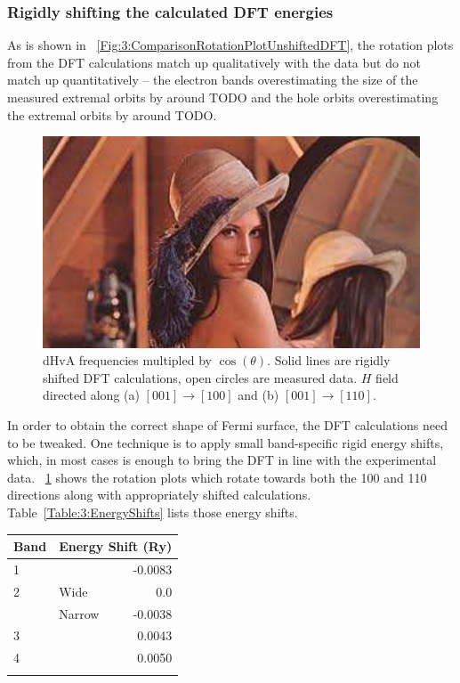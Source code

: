 \subsubsection{Rigidly shifting the calculated DFT energies}

As is shown in \fig~\ref{Fig:3:ComparisonRotationPlotUnshiftedDFT}, the rotation plots from the DFT calculations match up qualitatively with the data but do not match up quantitatively -- the electron bands overestimating the size of the measured extremal orbits by around TODO and the hole orbits overestimating the extremal orbits by around TODO. 

\begin{figure}[h!]
    \begin{center}
        \includegraphics[scale=0.7]{Misc/TODO}
        \caption{dHvA frequencies multipled by $\cos(\theta)$. Solid lines are rigidly shifted DFT calculations, open circles are measured data. $H$ field directed along (a) $[001]\rightarrow[100]$ and (b) $[001]\rightarrow[110]$.}
        \label{Fig:3:ComparisonRotationPlotMeasuredShiftedDFT}
    \end{center}
\end{figure}

In order to obtain the correct shape of Fermi surface, the DFT calculations need to be tweaked. One technique is to apply small band-specific rigid energy shifts, which, in most cases is enough to bring the DFT in line with the experimental data. \fig~\ref{Fig:3:ComparisonRotationPlotMeasuredShiftedDFT} shows the rotation plots which rotate towards both the 100 and 110 directions along with appropriately shifted calculations. Table~\ref{Table:3:EnergyShifts} lists those energy shifts.

\medskip

\begin{center}
    \begin{tabular}[h!]{llr}
\toprule
Band    & \multicolumn{2}{l}{Energy Shift (\unit{Ry})} \\
\midrule
1       &       & -0.0083      \\
2       & Wide  & 0.0          \\
        & Narrow & -0.0038     \\
3       &       & 0.0043       \\
4       &       & 0.0050        \\
\bottomrule
    \label{Table:3:EnergyShifts}
    \end{tabular}
\end{center}

